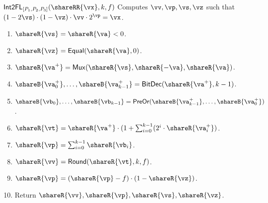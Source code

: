 \msubsubsection
  {$\mathsf{Int2FL}_{[P_1, P_2, P_3]}(\shareRR{\vx}, k, f)$}
  Computes $\vv, \vp, \vs, \vz$ such that $(1 - 2\vs) \cdot (1- \vz) \cdot \vv \cdot 2^\vp  = \vx$.
\begin{enumerate}
    \item $\shareR{\vs} = \shareR{\va} < 0$.
    \item $\shareR{\vz} = \mathsf{Equal}(\shareR{\va}, 0)$.
    \item $\shareR{\va^+} = \mathsf{Mux}(\shareR{\vs}, \shareR{-\va}, \shareR{\va})$.
    \item $\shareB{\va^+_0}, \dots, \shareB{\va^+_{k-1}} = \mathsf{BitDec}(\shareR{\va^+}, k-1)$.
    \item $\shareB{\vb_0}, \dots, \shareB{\vb_{k-1}} = \mathsf{PreOr}(\shareB{\va^+_{k-1}}, \dots, \shareB{\va^+_0})$.
    \item $\shareR{\vt} = \shareR{\va^+} \cdot (1 + \sum_{i=0}^{k-1} (2^i \cdot \shareR{\va^+_i})$.
    \item $\shareR{\vp} = \sum_{i=0}^{k-1} \shareR{\vb_i}$.
    \item $\shareR{\vv} = \mathsf{Round}(\shareR{\vt} , k, f)$.
    \item $\shareR{\vp} = (\shareR{\vp} - f) \cdot (1 - \shareR{\vz})$.
    \item Return $\shareR{\vv}, \shareR{\vp}, \shareR{\vs}, \shareR{\vz}$.
\end{enumerate}

